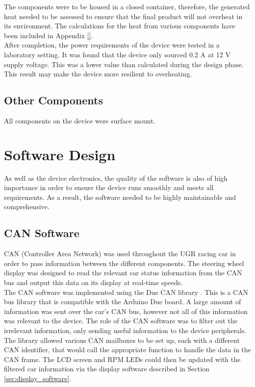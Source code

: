 \documentclass[a4paper,12pt]{article}
\begin{document}
The components were to be housed in a closed container, therefore, the generated heat needed to be assessed to ensure that the final product will not overheat in its environment. The calculations for the heat from various components have been included in Appendix \ref{}. \\

After completion, the power requirements of the device were tested in a laboratory setting. It was found that the device only sourced 0.2 A at 12 V supply voltage. This was a lower value than calculated during the design phase. This result may make the device more resilient to overheating.

\subsection{Other Components}
\label{sec:other_components}

All components on the device were surface mount.


\newpage
\section{Software Design}
\label{sec:software_design}

As well as the device electronics, the quality of the software is also of high importance in order to ensure the device runs smoothly and meets all requirements. As a result, the software needed to be highly maintainable and comprehensive.

\subsection{CAN Software}
\label{sec:CAN_software}

CAN (Controller Area Network) was used throughout the UGR racing car in order to pass information between the different components. The steering wheel display was designed to read the relevant car status information from the CAN bus and output this data on its display at real-time speeds. \\

The CAN software was implemented using the Due CAN library \cite{due_can}. This is a CAN bus library that is compatible with the Arduino Due board. A large amount of information was sent over the car’s CAN bus, however not all of this information was relevant to the device. The role of the CAN software was to filter out the irrelevant information, only sending useful information to the device peripherals. The library allowed various CAN mailboxes to be set up, each with a different CAN identifier, that would call the appropriate function to handle the data in the CAN frame. The LCD screen and RPM LEDs could then be updated with the filtered car information via the display software described in Section \ref{sec:display_software}. \\
\end{document}
